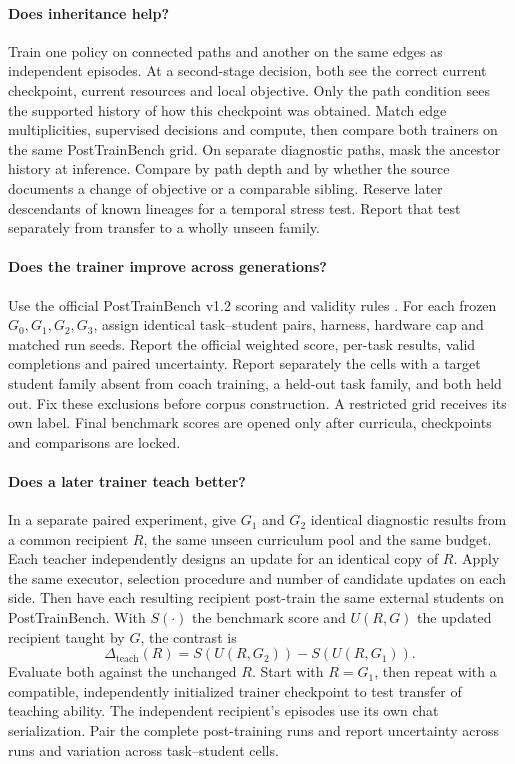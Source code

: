 \documentclass{article}
\begin{document}
\paragraph{Does inheritance help?}
Train one policy on connected paths and another on the same edges as independent episodes. At a second-stage decision, both see the correct current checkpoint, current resources and local objective. Only the path condition sees the supported history of how this checkpoint was obtained. Match edge multiplicities, supervised decisions and compute, then compare both trainers on the same PostTrainBench grid. On separate diagnostic paths, mask the ancestor history at inference. Compare by path depth and by whether the source documents a change of objective or a comparable sibling. Reserve later descendants of known lineages for a temporal stress test. Report that test separately from transfer to a wholly unseen family.

\paragraph{Does the trainer improve across generations?}
Use the official PostTrainBench v1.2 scoring and validity rules \citep{rank2026posttrainbench,ptb2026release}. For each frozen \(G_0,G_1,G_2,G_3\), assign identical task--student pairs, harness, hardware cap and matched run seeds. Report the official weighted score, per-task results, valid completions and paired uncertainty. Report separately the cells with a target student family absent from coach training, a held-out task family, and both held out. Fix these exclusions before corpus construction. A restricted grid receives its own label. Final benchmark scores are opened only after curricula, checkpoints and comparisons are locked.

\paragraph{Does a later trainer teach better?}
In a separate paired experiment, give \(G_1\) and \(G_2\) identical diagnostic results from a common recipient \(R\), the same unseen curriculum pool and the same budget. Each teacher independently designs an update for an identical copy of \(R\). Apply the same executor, selection procedure and number of candidate updates on each side. Then have each resulting recipient post-train the same external students on PostTrainBench. With \(S(\cdot)\) the benchmark score and \(U(R,G)\) the updated recipient taught by \(G\), the contrast is
\begin{equation}
\Delta_{\mathrm{teach}}(R)=S\!\left(U(R,G_2)\right)-S\!\left(U(R,G_1)\right).
\end{equation}
Evaluate both against the unchanged \(R\). Start with \(R=G_1\), then repeat with a compatible, independently initialized trainer checkpoint to test transfer of teaching ability. The independent recipient's episodes use its own chat serialization. Pair the complete post-training runs and report uncertainty across runs and variation across task--student cells.
\end{document}
